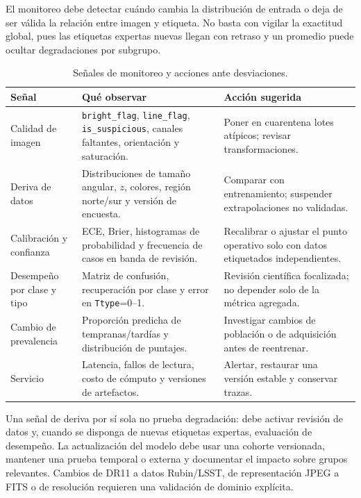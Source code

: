 \documentclass[letterpaper,11pt]{article}
\begin{document}
El monitoreo debe detectar cuándo cambia la distribución de entrada o deja de ser válida la relación entre imagen y etiqueta. No basta con vigilar la exactitud global, pues las etiquetas expertas nuevas llegan con retraso y un promedio puede ocultar degradaciones por subgrupo.

\begin{table}[H]
\centering
\caption{Señales de monitoreo y acciones ante desviaciones.}
\label{tab:monitoreo}
\begin{tabularx}{\linewidth}{>{\raggedright\arraybackslash}p{3.1cm}X>{\raggedright\arraybackslash}p{3.1cm}}
\toprule
Señal & Qué observar & Acción sugerida\\
\midrule
Calidad de imagen & \texttt{bright\_flag}, \texttt{line\_flag}, \texttt{is\_suspicious}, canales faltantes, orientación y saturación. & Poner en cuarentena lotes atípicos; revisar transformaciones.\\
Deriva de datos & Distribuciones de tamaño angular, $z$, colores, región norte/sur y versión de encuesta. & Comparar con entrenamiento; suspender extrapolaciones no validadas.\\
Calibración y confianza & ECE, Brier, histogramas de probabilidad y frecuencia de casos en banda de revisión. & Recalibrar o ajustar el punto operativo solo con datos etiquetados independientes.\\
Desempeño por clase y tipo & Matriz de confusión, recuperación por clase y error en \texttt{Ttype}=0--1. & Revisión científica focalizada; no depender solo de la métrica agregada.\\
Cambio de prevalencia & Proporción predicha de tempranas/tardías y distribución de puntajes. & Investigar cambios de población o de adquisición antes de reentrenar.\\
Servicio & Latencia, fallos de lectura, costo de cómputo y versiones de artefactos. & Alertar, restaurar una versión estable y conservar trazas.\\
\bottomrule
\end{tabularx}
\end{table}

Una señal de deriva por sí sola no prueba degradación: debe activar revisión de datos y, cuando se disponga de nuevas etiquetas expertas, evaluación de desempeño. La actualización del modelo debe usar una cohorte versionada, mantener una prueba temporal o externa y documentar el impacto sobre grupos relevantes. Cambios de DR11 a datos Rubin/LSST, de representación JPEG a FITS o de resolución requieren una validación de dominio explícita.
\end{document}

